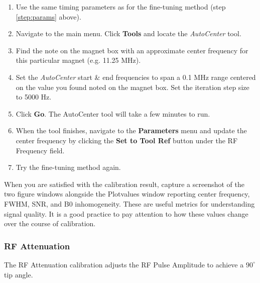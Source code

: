 \begin{enumerate}
    \item Use the same timing parameters as for the fine-tuning method (step \ref{step:params} above).
    \item Navigate to the main menu. Click \textbf{Tools} and locate the \emph{AutoCenter} tool.
    \item Find the note on the magnet box with an approximate center frequency for this particular magnet (e.g. 11.25 MHz).
    \item Set the \emph{AutoCenter} start \& end frequencies to span a 0.1 MHz range centered on the value you found noted on the magnet box. Set the iteration step size to 5000 Hz.
    \item Click \textbf{Go}. The AutoCenter tool will take a few minutes to run. 
    \item When the tool finishes, navigate to the \textbf{Parameters} menu and update the center frequency by clicking the \textbf{Set to Tool Ref} button under the RF Frequency field.
    \item Try the fine-tuning method again.
\end{enumerate}

\noindent{}\color{red}When you are satisfied with the calibration result, capture a screenshot of the two figure windows alongside the Plotvalues window reporting center frequency, FWHM, SNR, and B0 inhomogeneity. These are useful metrics for understanding signal quality. It is a good practice to pay attention to how these values change over the course of calibration.
\color{black}

\subsubsection{RF Attenuation}

The RF Attenuation calibration adjusts the RF Pulse Amplitude to achieve a $90^{\circ}$ tip angle.

